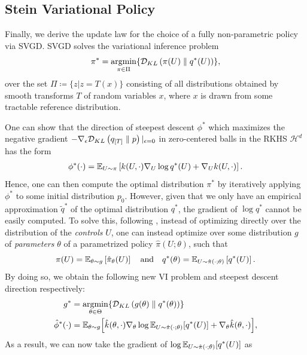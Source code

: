 \documentclass[twoside,11pt]{article}
\begin{document}
\subsection{Stein Variational Policy}
Finally, we derive the update law for the choice of a fully non-parametric policy via SVGD.
SVGD solves the variational inference problem
\begin{equation}
    \pi^* = \argmin_{\pi \in \Pi} \{ \KL{\pi(U)}{q^*(U)} \} ,
\end{equation}
over the set $\Pi \coloneqq \{ z | z = T(x) \}$ consisting of all distributions obtained by smooth transforms $T$ of random variables $x$, where $x$ is drawn from some tractable reference distribution.

One can show that the direction of steepest descent $\phi^*$ which maximizes the negative gradient $-\nabla_\epsilon \mathcal{D}_{KL}\left({ q_{[T]} }\parallel { p }\right) \vert_{\epsilon=0}$ in zero-centered balls in the RKHS $\mathcal{H}^d$ has the form
\begin{align}
    \phi^*(\cdot) = \mathbb{E}_{U \sim \pi} \left[ k(U, \cdot) \nabla_U \log q^*(U) + \nabla_U k(U, \cdot) \right] .
\end{align}
Hence, one can then compute the optimal distribution $\pi^*$ by iteratively applying $\phi^*$ to some initial distribution $p_0$.
However, given that we only have an empirical approximation $\tilde{q}^*$ of the optimal distribution $q^*$, the gradient of $\log q^*$ cannot be easily computed.
To solve this, following \cite{lambert2020stein}, instead of optimizing directly over the distribution of the \textit{controls} $U$,
one can instead optimize over some distribution $g$ of \textit{parameters} $\theta$ of a parametrized policy $\hat{\pi}(U; \theta)$, such that
\begin{equation}
    \pi(U) = \mathbb{E}_{\theta \sim g} \left[\hat{\pi}_\theta(U) \right] \quad \text{and} \quad q^*(\theta) = \mathbb{E}_{U \sim \hat{\pi}(\cdot; \theta)} \left[ q^*(U) \right] .
\end{equation}
By doing so, we obtain the following new \ac{VI} problem and steepest descent direction respectively:
\begin{align}
    g^* &= \argmin_{\theta \in \Theta} \{ \KL{ g(\theta) }{ q^*(\theta) } \} \\
    \hat{\phi}^*(\cdot) &= \Eb_{\theta \sim g} \Big[ \hat{k}(\theta, \cdot) \nabla_\theta \log \Eb_{U \sim \hat{\pi}(\cdot; \theta)} [q^*(U)] + \nabla_\theta \hat{k}(\theta, \cdot) \Big] ,
\end{align}
As a result, we can now take the gradient of $\log \mathbb{E}_{U \sim \hat{\pi}(\cdot; \theta)} [q^*(U)]$ as
\end{document}
